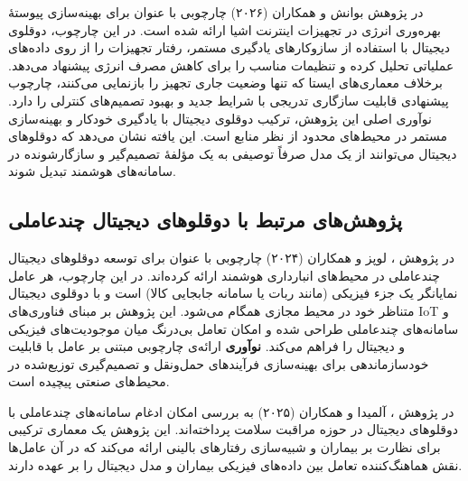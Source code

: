 در پژوهش
بوانش و همکاران (۲۰۲۶)
\cite{bhuvanesh2026selflearningdt}
چارچوبی با عنوان
برای بهینه‌سازی پیوستهٔ بهره‌وری انرژی در تجهیزات اینترنت اشیا ارائه شده است. در این چارچوب، دوقلوی دیجیتال با استفاده از سازوکارهای یادگیری مستمر، رفتار تجهیزات را از روی داده‌های عملیاتی تحلیل کرده و تنظیمات مناسب را برای کاهش مصرف انرژی پیشنهاد می‌دهد. برخلاف معماری‌های ایستا که تنها وضعیت جاری تجهیز را بازنمایی می‌کنند، چارچوب پیشنهادی قابلیت سازگاری تدریجی با شرایط جدید و بهبود تصمیم‌های کنترلی را دارد. نوآوری اصلی این پژوهش، ترکیب دوقلوی دیجیتال با یادگیری خودکار و بهینه‌سازی مستمر در محیط‌های محدود از نظر منابع است. این یافته نشان می‌دهد که دوقلوهای دیجیتال می‌توانند از یک مدل صرفاً توصیفی به یک مؤلفهٔ تصمیم‌گیر و سازگارشونده در سامانه‌های هوشمند تبدیل شوند.



\subsection{پژوهش‌های مرتبط با دوقلوهای دیجیتال چندعاملی}

در پژوهش \cite{lopez2024madtwin}، 
لوپز و همکاران (۲۰۲۴)
چارچوبی با عنوان  برای توسعه دوقلوهای دیجیتال چندعاملی در محیط‌های انبارداری هوشمند ارائه کرده‌اند. در این چارچوب، هر عامل نمایانگر یک جزء فیزیکی (مانند ربات یا سامانه جابجایی کالا) است و با دوقلوی دیجیتال متناظر خود در محیط مجازی همگام می‌شود. این پژوهش بر مبنای فناوری‌های 
 \gls{IoT}
  و سامانه‌های چندعاملی طراحی شده و امکان تعامل بی‌درنگ میان موجودیت‌های فیزیکی و دیجیتال را فراهم می‌کند. \textbf{نوآوری} ارائه‌ی چارچوبی مبتنی بر عامل با قابلیت خودسازماندهی برای بهینه‌سازی فرآیندهای حمل‌ونقل و تصمیم‌گیری توزیع‌شده در محیط‌های صنعتی پیچیده است.

در پژوهش \cite{almeida2025healthagentsdt}، 
آلمیدا و همکاران (۲۰۲۵)
 به بررسی امکان ادغام سامانه‌های چندعاملی با دوقلوهای دیجیتال در حوزه مراقبت سلامت پرداخته‌اند. این پژوهش یک معماری ترکیبی برای نظارت بر بیماران و شبیه‌سازی رفتارهای بالینی ارائه می‌کند که در آن عامل‌ها نقش هماهنگ‌کننده تعامل بین داده‌های فیزیکی بیماران و مدل دیجیتال را بر عهده دارند. 

%

